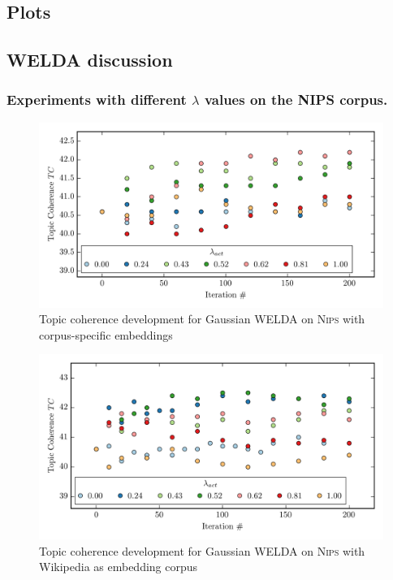 \documentclass[
        a4paper,
        titlepage,
        twoside,
        parskip
        ]{scrbook}
\theoremstyle{break}
\begin{document}
\begin{appendices}
\chapter{Plots}
  \section{WELDA discussion}
  \subsection{Experiments with different $\lambda$ values on the N{\footnotesize IPS} corpus.}
  \label{sec:appendix_nips_lambda}
  \begin{figure}[H]
         \centering
         \includegraphics[width=\textwidth]{figures/welda_gaussian_nips_50.png}
         \caption{Topic coherence development for Gaussian WELDA on \textsc{Nips} with corpus-specific embeddings}
         \label{fig:welda_gaussian_nips_50}
  \end{figure}
  \begin{figure}[H]
         \centering
         \includegraphics[width=\textwidth]{figures/welda_gaussian_nips_200.png}
         \caption{Topic coherence development for Gaussian WELDA on \textsc{Nips} with Wikipedia as embedding corpus}
         \label{fig:welda_gaussian_nips_200}
  \end{figure}
  

\end{appendices}
\end{document}

